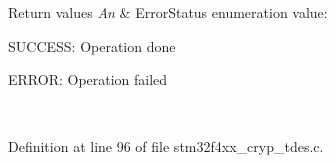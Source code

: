 \begin{DoxyRetVals}{Return values}
{\em An} & Error\-Status enumeration value\-:
\begin{DoxyItemize}
\item S\-U\-C\-C\-E\-S\-S\-: Operation done
\item E\-R\-R\-O\-R\-: Operation failed 
\end{DoxyItemize}\\
\hline
\end{DoxyRetVals}


Definition at line 96 of file stm32f4xx\-\_\-cryp\-\_\-tdes.\-c.

